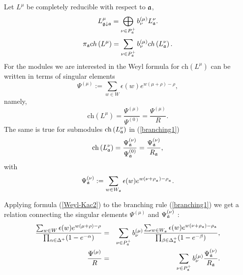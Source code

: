 \documentclass[12pt]{article}
\begin{document}
Let $L^{\mu }$ be completely reducible with respect to $\frak{a}$,
\[
L_{\frak{g}\downarrow \frak{a}}^{\mu }=\bigoplus\limits_{\nu \in P_{\frak{a}%
}^{+}}b_{\nu }^{\left( \mu \right) }L_{\frak{a}}^{\nu }.
\]
\begin{equation}
\pi _{\frak{a}}ch\left( L^{\mu }\right) =\sum_{\nu \in P_{\frak{a}%
}^{+}}b_{\nu }^{(\mu )}ch\left( L_{\frak{a}}^{\nu }\right) .
\label{branching1}
\end{equation}
For the modules we are interested in the Weyl formula for $\mathrm{ch}\left(
L^{\mu }\right) $ can be written in terms of singular elements \cite
{humphreys1997introduction}
\[
\Psi ^{\left( \mu \right) }:=\sum\limits_{w\in W}\epsilon (w)e^{w(\mu +\rho
)-\rho },
\]
namely,
\begin{equation}
\mathrm{ch}\left( L^{\mu }\right) =\frac{\Psi ^{\left( \mu \right) }}{\Psi
^{\left( 0\right) }}=\frac{\Psi ^{\left( \mu \right) }}{R}.
\label{Weyl-Kac2}
\end{equation}
The same is true for submodules $\mathrm{ch}\left( L_{\frak{a}}^{\nu
}\right) $ in (\ref{branching1})
\[
\mathrm{ch}\left( L_{\frak{a}}^{\nu }\right) =\frac{\Psi _{\frak{a}}^{\left(
\nu \right) }}{\Psi _{\frak{a}}^{\left( 0\right) }}=\frac{\Psi _{\frak{a}%
}^{\left( \nu \right) }}{R_{\frak{a}}},
\]
with
\[
\Psi _{\frak{a}}^{\left( \nu \right) }:=\sum\limits_{w\in W_{\frak{a}%
}}\epsilon (w)e^{w(\nu +\rho _{_{\frak{a}}})-\rho _{_{\frak{a}}}}.
\]

Applying formula (\ref{Weyl-Kac2}) to the branching rule (\ref{branching1})
we get a relation connecting the singular elements $\Psi ^{\left( \mu
\right) }$ and $\Psi _{\frak{a}}^{\left( \nu \right) }$ :
\begin{eqnarray}
\frac{\sum_{w \in W}\epsilon (w )e^{w (\mu +\rho )-\rho }}{\prod_{\alpha \in
\Delta ^{+}}(1-e^{-\alpha })} &=&\sum_{\nu \in P_{\frak{a}}^{+}}b_{\nu
}^{(\mu )}\frac{\sum_{w \in W_{\frak{a}}}\epsilon (w )e^{w (\nu +\rho _{%
\frak{a}})-\rho _{\frak{a}}}}{\prod_{\beta \in \Delta _{\frak{a}%
}^{+}}(1-e^{-\beta })},  \nonumber  \label{eq:4} \\
\frac{\Psi ^{\left( \mu \right) }}{R} &=&\sum_{\nu \in P_{\frak{a}%
}^{+}}b_{\nu }^{(\mu )}\frac{\Psi _{\frak{a}}^{\left( \nu \right) }}{R_{%
\frak{a}}}.  \label{singular main}
\end{eqnarray}
\end{document}
